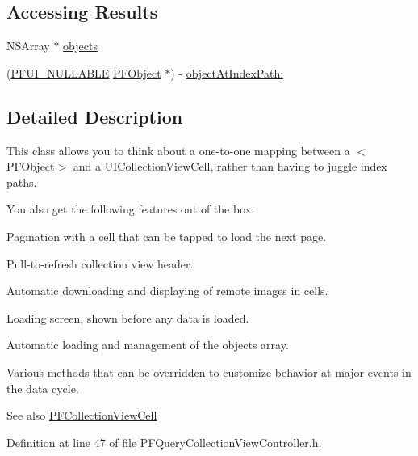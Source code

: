 \subsection*{Accessing Results}
\label{_amgrp09728c99dc72fa61614ba2e2c37af37c}%


 

 \begin{DoxyCompactItemize}
\item 
N\+S\+Array $\ast$ \hyperlink{interface_p_f_query_collection_view_controller_a97138630bccda46aa8acdd0fd460b42a}{objects}
\item 
(\hyperlink{_parse_u_i_constants_8h_af6e64a847348a9ac2a77923670373fe8}{P\+F\+U\+I\+\_\+\+N\+U\+L\+L\+A\+B\+L\+E} \hyperlink{interface_p_f_object}{P\+F\+Object} $\ast$) -\/ \hyperlink{interface_p_f_query_collection_view_controller_aa7af282869b7ffda762afbee45ac216d}{object\+At\+Index\+Path\+:}
\end{DoxyCompactItemize}


\subsection{Detailed Description}
This class allows you to think about a one-\/to-\/one mapping between a $<$\+P\+F\+Object$>$ and a {\ttfamily U\+I\+Collection\+View\+Cell}, rather than having to juggle index paths.

You also get the following features out of the box\+:


\begin{DoxyItemize}
\item Pagination with a cell that can be tapped to load the next page.
\item Pull-\/to-\/refresh collection view header.
\item Automatic downloading and displaying of remote images in cells.
\item Loading screen, shown before any data is loaded.
\item Automatic loading and management of the objects array.
\item Various methods that can be overridden to customize behavior at major events in the data cycle.
\end{DoxyItemize}

\begin{DoxySeeAlso}{See also}
\hyperlink{interface_p_f_collection_view_cell}{P\+F\+Collection\+View\+Cell} 
\end{DoxySeeAlso}


Definition at line 47 of file P\+F\+Query\+Collection\+View\+Controller.\+h.



